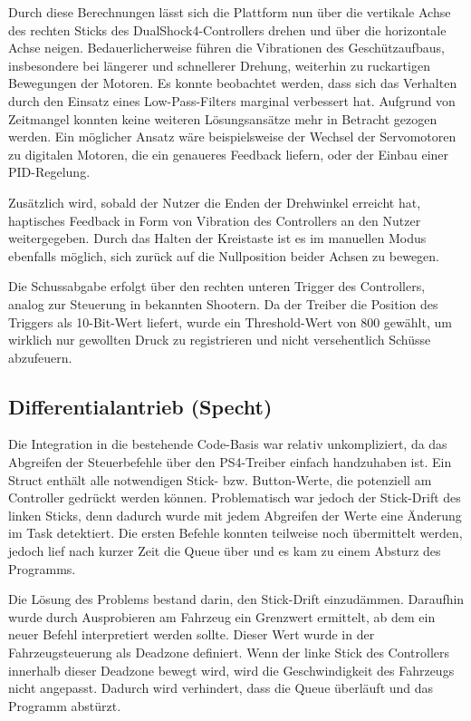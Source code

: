 Durch diese Berechnungen lässt sich die Plattform nun über die vertikale Achse des rechten Sticks des DualShock4-Controllers drehen und über die horizontale Achse neigen. 
Bedauerlicherweise führen die Vibrationen des Geschützaufbaus, insbesondere bei längerer und schnellerer Drehung, weiterhin zu ruckartigen Bewegungen der Motoren. 
Es konnte beobachtet werden, dass sich das Verhalten durch den Einsatz eines Low-Pass-Filters marginal verbessert hat. Aufgrund von Zeitmangel konnten keine weiteren Lösungsansätze mehr in Betracht gezogen werden. 
Ein möglicher Ansatz wäre beispielsweise der Wechsel der Servomotoren zu digitalen Motoren, die ein genaueres Feedback liefern, oder der Einbau einer PID-Regelung.

Zusätzlich wird, sobald der Nutzer die Enden der Drehwinkel erreicht hat, haptisches Feedback in Form von Vibration des Controllers an den Nutzer weitergegeben. 
Durch das Halten der Kreistaste ist es im manuellen Modus ebenfalls möglich, sich zurück auf die Nullposition beider Achsen zu bewegen.

Die Schussabgabe erfolgt über den rechten unteren Trigger des Controllers, analog zur Steuerung in bekannten Shootern. 
Da der Treiber die Position des Triggers als 10-Bit-Wert liefert, wurde ein Threshold-Wert von 800 gewählt, um wirklich nur gewollten Druck zu registrieren und nicht versehentlich Schüsse abzufeuern.

\subsection{Differentialantrieb (Specht)} \label{sec:diff_drive_integration}

Die Integration in die bestehende Code-Basis war relativ unkompliziert, da das Abgreifen der Steuerbefehle über den PS4-Treiber einfach handzuhaben ist. Ein Struct enthält alle notwendigen Stick- bzw. Button-Werte, die potenziell am Controller gedrückt werden können. Problematisch war jedoch der Stick-Drift des linken Sticks, denn dadurch wurde mit jedem Abgreifen der Werte eine Änderung im Task detektiert. Die ersten Befehle konnten teilweise noch übermittelt werden, jedoch lief nach kurzer Zeit die Queue über und es kam zu einem Absturz des Programms. \newline

Die Lösung des Problems bestand darin, den Stick-Drift einzudämmen. Daraufhin wurde durch Ausprobieren am Fahrzeug ein Grenzwert ermittelt, ab dem ein neuer Befehl interpretiert werden sollte. Dieser Wert wurde in der Fahrzeugsteuerung als Deadzone definiert. Wenn der linke Stick des Controllers innerhalb dieser Deadzone bewegt wird, wird die Geschwindigkeit des Fahrzeugs nicht angepasst. Dadurch wird verhindert, dass die Queue überläuft und das Programm abstürzt. \newline

